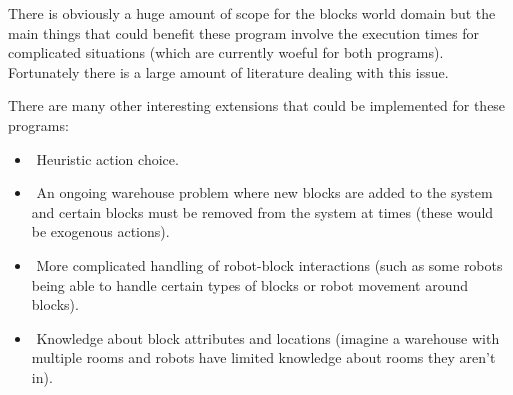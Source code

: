 \documentclass{article}
\begin{document}
There is obviously a huge amount of scope for the blocks world domain but the
main things that could benefit these program involve the execution times for
complicated situations (which are currently woeful for both programs). Fortunately
there is a large amount of literature dealing with this issue.

There are many other interesting extensions that could be implemented for
these programs:
\begin{itemize}
	\item Heuristic action choice.
	\item An ongoing warehouse problem where new blocks are added to the system
and certain blocks must be removed from the system at times (these would
be exogenous actions).
	\item More complicated handling of robot-block interactions (such as some robots
being able to handle certain types of blocks or robot movement around
blocks).
	\item Knowledge about block attributes and locations (imagine a warehouse
with multiple rooms and robots have limited knowledge about rooms they
aren't in).
\end{itemize}
\end{document}
